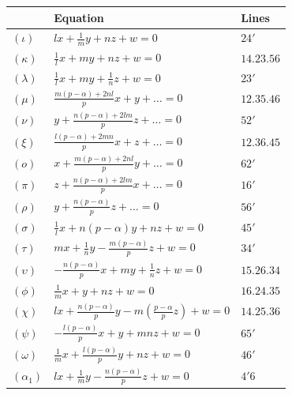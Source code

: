 \documentclass[11pt,a4paper]{book}
\begin{document}
\begin{table}[h]
\centering
\begin{tabular}{@{}lll@{}}
\toprule
& Equation & Lines \\
\midrule
$(\iota)$ & $lx + \frac{1}{m}y + nz + w = 0$ & $24'$ \\
$(\kappa)$ & $\frac{1}{l}x + my + nz + w = 0$ & $14.23.56$ \\
$(\lambda)$ & $\frac{1}{l}x + my + \frac{1}{n}z + w = 0$ & $23'$ \\
$(\mu)$ & $\frac{m(p-\alpha) + 2nl}{p}x + y + \ldots = 0$ & $12.35.46$ \\
$(\nu)$ & $y + \frac{n(p-\alpha) + 2lm}{p}z + \ldots = 0$ & $52'$ \\
$(\xi)$ & $\frac{l(p-\alpha) + 2mn}{p}x + z + \ldots = 0$ & $12.36.45$ \\
$(o)$ & $x + \frac{m(p-\alpha) + 2nl}{p}y + \ldots = 0$ & $62'$ \\
$(\pi)$ & $z + \frac{n(p-\alpha) + 2lm}{p}x + \ldots = 0$ & $16'$ \\
$(\rho)$ & $y + \frac{n(p-\alpha)}{p}z + \ldots = 0$ & $56'$ \\
$(\sigma)$ & $\frac{1}{l}x + n(p-\alpha)y + nz + w = 0$ & $45'$ \\
$(\tau)$ & $mx + \frac{1}{n}y - \frac{m(p-\alpha)}{p}z + w = 0$ & $34'$ \\
$(\upsilon)$ & $-\frac{n(p-\alpha)}{p}x + my + \frac{1}{n}z + w = 0$ & $15.26.34$ \\
$(\phi)$ & $\frac{1}{m}x + y + nz + w = 0$ & $16.24.35$ \\
$(\chi)$ & $lx + \frac{n(p-\alpha)}{p}y - m(\frac{p-\alpha}{p}z) + w = 0$ & $14.25.36$ \\
$(\psi)$ & $-\frac{l(p-\alpha)}{p}x + y + mnz + w = 0$ & $65'$ \\
$(\omega)$ & $\frac{1}{m}x + \frac{l(p-\alpha)}{p}y + nz + w = 0$ & $46'$ \\
$(\alpha_{1})$ & $lx + \frac{1}{m}y - \frac{n(p-\alpha)}{p}z + w = 0$ & $4'6$ \\
\bottomrule
\end{tabular}
\end{table}

\newpage

\setcounter{page}{449}
\end{document}

